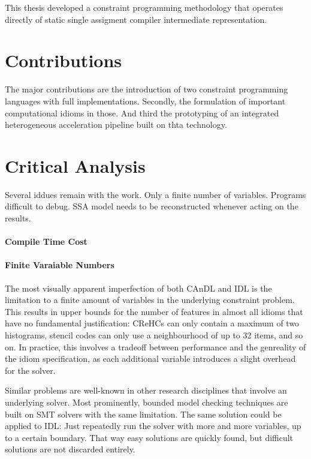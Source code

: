 
    This thesis developed a constraint programming methodology that operates
    directly of static single assigment compiler intermediate representation.

\section{Contributions}

    The major contributions are the introduction of two constraint programming
    languages with full implementations.
    Secondly, the formulation of important computational idioms in those.
    And third the prototyping of an integrated heterogeneous acceleration
    pipeline built on thta technology.

\section{Critical Analysis}

    Several iddues remain with the work.
    Only a finite number of variables.
    Programs difficult to debug.
    SSA model needs to be reconstructed whenever acting on the results.

    \paragraph*{Compile Time Cost}

    \paragraph*{Finite Varaiable Numbers}
    The most visually apparent imperfection of both CAnDL and IDL is the
    limitation to a finite amount of variables in the underlying constraint
    problem.
    This results in upper bounds for the number of features in almost all idioms
    that have no fundamental justification:
    CReHCs can only contain a maximum of two histograms, stencil codes can only
    use a neighbourhood of up to 32 items, and so on.
    In practice, this involves a tradeoff between performance and the genreality
    of the idiom specification, as each additional variable introduces a slight
    overhead for the solver.

    Similar problems are well-known in other research disciplines that involve
    an underlying solver.
    Most prominently, bounded model checking techniques are built on SMT solvers
    with the same limitation.
    The same solution could be applied to IDL: Just repeatedly run the solver
    with more and more variables, up to a certain boundary.
    That way easy solutions are quickly found, but difficult solutions are not
    discarded entirely.

